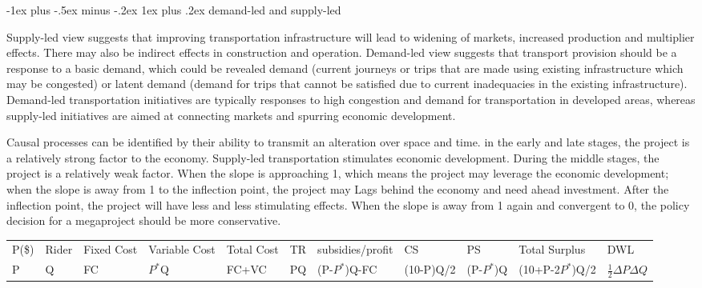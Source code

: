 \documentclass[10pt,portrait]{article}
\makeatletter
\renewcommand{\subsubsection}{\@startsection{subsubsection}{3}{0mm}%
                                {-1ex plus -.5ex minus -.2ex}%
                                {1ex plus .2ex}%
                                {\normalfont\small\bfseries}}
\makeatother
\begin{document}
\begin{multicols}{2}
\subsubsection{demand-led and supply-led}

Supply-led view suggests that improving transportation infrastructure will lead to widening of markets, increased production and multiplier effects. There may also be indirect effects in construction and operation. Demand-led view suggests that transport provision should be a response to a basic demand, which could be revealed demand (current journeys or trips that are made using existing infrastructure which may be congested) or latent demand (demand for trips that cannot be satisfied due to current inadequacies in the existing infrastructure). Demand-led transportation initiatives are typically responses to high congestion and demand for transportation in developed areas, whereas supply-led initiatives are aimed at connecting markets and spurring economic development.

Causal processes can be identified by their ability to transmit an alteration over space and time.  in the early and late stages, the project is a relatively strong factor to the economy. Supply-led transportation stimulates economic development. During the middle stages, the project is a relatively weak factor. When the slope is approaching 1, which means the project may leverage the economic development; when the slope is away from 1 to the inflection point, the project may Lags behind the economy and need ahead investment. After the inflection point, the project will have less and less stimulating effects. When the slope is away from 1 again and convergent to 0, the policy decision for a megaproject should be more conservative. 

\end{multicols}

\begin{tabular}{l|l|l|l|l|l|l|l|l|l|l}
P(\$)&Rider&Fixed Cost&Variable Cost&Total Cost&TR&subsidies/profit&CS&PS&Total Surplus& DWL\\
P  & Q &FC &$P^*$Q &FC+VC  &PQ &(P-$P^*$)Q-FC &(10-P)Q/2&(P-$P^*$)Q &(10+P-2$P^*$)Q/2&$\frac12\Delta P\Delta Q$
\end{tabular}
\end{document}
